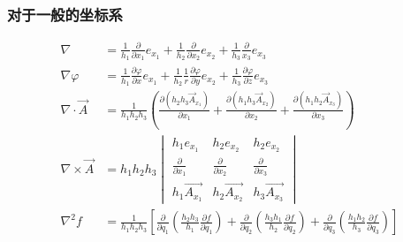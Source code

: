 \documentclass[twocolumn]{ctexart}
\begin{document}
\subsubsection{对于一般的坐标系}
\begin{align}
  \nabla&=\frac{1}{h_1}\frac{\partial }{\partial x_1}e_{x_1}+
  \frac{1}{h_2}\frac{\partial }{\partial x_2}e_{x_2}+
  \frac{1}{h_3}\frac{\partial }{x_3}e_{x_3}    
  \tag{1.9.c} \\
  \nabla \varphi&=\frac{1}{h_1}\frac{\partial \varphi}{\partial x}e_{x_1}+
  \frac{1}{h_2}\frac{1}{r}\frac{\partial \varphi}{\partial y}e_{x_2}+
  \frac{1}{h_3}\frac{\partial \varphi}{\partial z}e_{x_3}    
  \tag{1.9.d} \\
  \nabla \cdot \vec{A}&=\frac{1}{h_1h_2h_3}(\frac{\partial( h_2h_3\vec{A}_{x_1})}{\partial x_1}+\frac{\partial( h_1h_3\vec{A}_{x_2})}{\partial x_2}+\frac{\partial( h_1h_2\vec{A}_{x_3})}{\partial x_3}  ) 
  \tag{1.9.e} \\
  \nabla \times \vec{A}&=
  h_1h_2h_3\begin{vmatrix}
    h_1e_{x_1}& h_2e_{x_2} & h_2e_{x_2}\\
    \frac{\partial }{\partial x_1}&\frac{\partial }{\partial x_2}  &\frac{\partial }{\partial x_3} \\
    h_1 \vec{A_{x_1}}&  h_2 \vec{A_{x_2}} & h_3 \vec{A_{x_3}}
  \end{vmatrix}
  \tag{1.9.f} \\
  \nabla^{2}f&= \frac{1}{h_{1}h_{2}h_{3}}\left[ \frac{\partial}{\partial q_{1}}(\frac{h_{2}h_{3}}{h_{1}}\frac{\partial f}{\partial q_{1}})+ \frac{\partial}{\partial q_{2}}(\frac{h_{3}h_{1}}{h_{2}}\frac{\partial f}{\partial q_{2}})+ \frac{\partial}{\partial q_{3}}(\frac{h_{1}h_{2}}{h_{3}}\frac{\partial f}{\partial q_{3}})\right]
  \tag{1.9.g} 
\end{align}

\end{document}
